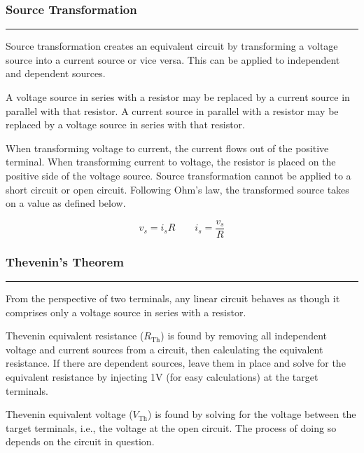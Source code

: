 \documentclass{article}
\begin{document}
    \smallskip
    \subsubsection*{Source Transformation}
    \vspace{-1em}
    \rule{\linewidth}{0.1mm}

    \smallskip\noindent
    Source transformation creates an equivalent circuit by transforming a voltage source into a current source or vice versa.
    This can be applied to independent and dependent sources.

    A voltage source in series with a resistor may be replaced by a current source in parallel with that resistor.
    A current source in parallel with a resistor may be replaced by a voltage source in series with that resistor.

    When transforming voltage to current, the current flows out of the positive terminal.
    When transforming current to voltage, the resistor is placed on the positive side of the voltage source.
    Source transformation cannot be applied to a short circuit or open circuit.
    Following Ohm's law, the transformed source takes on a value as defined below.

    \[
        v_s = i_s R     \qquad   i_s = \frac{v_s}{R}
    \]

    \pagebreak
    \smallskip
    \subsubsection*{Thevenin's Theorem}
    \vspace{-1em}
    \rule{\linewidth}{0.1mm}

    \smallskip\noindent
    From the perspective of two terminals, any linear circuit behaves as though it comprises only a voltage source in series with a resistor.

    Thevenin equivalent resistance ($R_\text{Th}$) is found by removing all independent voltage and current sources from a circuit, then calculating the equivalent resistance.
    If there are dependent sources, leave them in place and solve for the equivalent resistance by injecting 1V (for easy calculations) at the target terminals.

    Thevenin equivalent voltage ($V_\text{Th}$) is found by solving for the voltage between the target terminals, i.e., the voltage at the open circuit.
    The process of doing so depends on the circuit in question.
\end{document}
